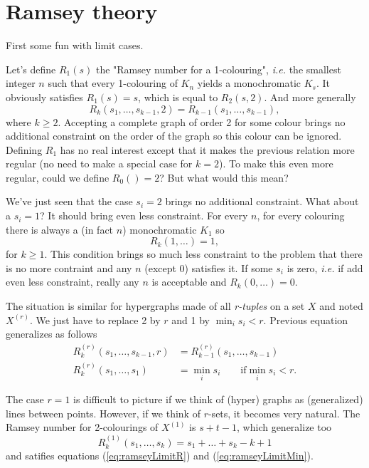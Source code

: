 \section{Ramsey theory}

First some fun with limit cases.

Let's define $R_1(s)$ the "Ramsey number for a 1-colouring",
\textit{i.e.} the smallest integer $n$ such that every 1-colouring of $K_n$ yields a monochromatic $K_s$.
It obviously satisfies $R_1(s) = s$, which is equal to $R_2(s,2)$. And more generally
\begin{equation}
    R_k(s_1,\dots,s_{k-1},2) = R_{k-1}(s_1,\dots,s_{k-1}) ,
\end{equation}
where $k \geq 2$. Accepting a complete graph of order 2 for some colour brings no additional constraint on the order of the graph so this colour can be ignored.
Defining $R_1$ has no real interest except that it makes the previous relation more regular (no need to make a special case for $k=2$).
To make this even more regular, could we define $R_0() = 2$? But what would this mean?

We've just seen that the case $s_i = 2$ brings no additional constraint. What about a $s_i = 1$? It should bring even less constraint.
For every $n$, for every colouring there is always a (in fact $n$) monochromatic $K_1$ so
\begin{equation}
    R_k(1,\dots)=1 ,
\end{equation}
for $k \geq 1$.
This condition brings so much less constraint to the problem that there is no more contraint and any $n$ (except 0) satisfies it.
If some $s_i$ is zero, \textit{i.e.} if add even less constraint, really any $n$ is acceptable and $R_k(0,\dots) = 0$.


The situation is similar for hypergraphs made of all \emph{r-tuples} on a set $X$ and noted $X^{(r)}$.
We just have to replace 2 by $r$ and 1 by $\min_i s_i < r$.
Previous equation generalizes as follows
\begin{align}
    \label{eq:ramseyLimitR}
    R_k^{(r)}(s_1,\dots,s_{k-1},r) & = R_{k-1}^{(r)}(s_1,\dots,s_{k-1}) \\
    \label{eq:ramseyLimitMin}
    R_k^{(r)}(s_1,\dots,s_1) & = \min_i s_i \qquad \text{if} \min_i s_i < r .
\end{align}

The case $r = 1$ is difficult to picture if we think of (hyper) graphs as (generalized) lines between points. However, if we think of $r$-sets, it becomes very natural.
The Ramsey number for 2-colourings of $X^{(1)}$ is $s+t-1$, which generalize too
\begin{equation}
    R_k^{(1)}(s_1,\dots,s_k) = s_1 + \dots + s_k - k + 1
\end{equation}
and satifies equations (\ref{eq:ramseyLimitR}) and (\ref{eq:ramseyLimitMin}).

